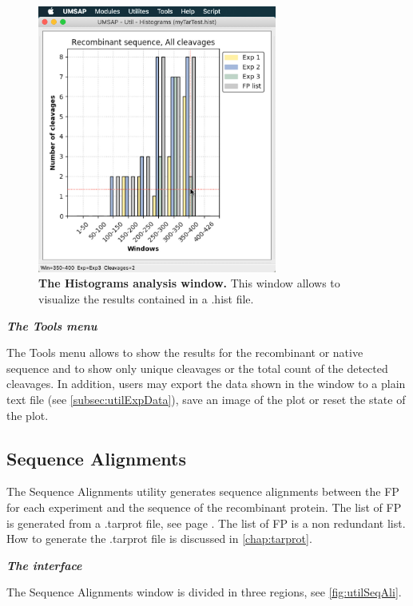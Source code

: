 \begin{figure}[h]
	\centering
	\includegraphics[width=0.7\textwidth]{./IMAGES/UTIL-HIST-WINDOW/util-histo-res.jpg}	    
	\caption[The Histograms analysis window]{\textbf{The Histograms analysis window.} This window allows to visualize the results contained in a .hist file.} 
	\label{fig:utilHistoCutShow}
	\vspace{-5pt} 	
\end{figure}

\textit{\textbf{The Tools menu}}

The Tools menu allows to show the results for the recombinant or native sequence and to show only unique cleavages or the total count of the detected cleavages. In addition, users may export the data shown in the window to a plain text file (see \autoref{subsec:utilExpData}), save an image of the plot or reset the state of the plot.

\subsection{Sequence Alignments}
\label{subsec:utilSeqAli}
The Sequence Alignments utility generates sequence alignments between the FP for each experiment and the sequence of the recombinant protein. The list of FP is generated from a .tarprot file, see page \pageref{par:tarprotPIP}. The list of FP is a non redundant list. How to generate the .tarprot file is discussed in \autoref{chap:tarprot}.

\textit{\textbf{The interface}}

The Sequence Alignments window is divided in three regions, see \autoref{fig:utilSeqAli}.


